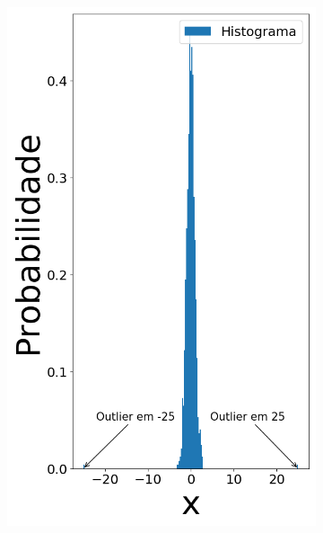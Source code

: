 \begin{figure}[H]
\begin{subfigure}[b]{0.27\textwidth}
		\caption{}
		\label{fig:randn}
	\end{subfigure}
	\hfill
	\begin{subfigure}[b]{0.27\textwidth}
		\centering 
		\includegraphics[width=\linewidth]{./figuras/datanormal_25}
		\caption{}
		\label{fig:randn_out}
	\end{subfigure}
	\hfill
	\begin{subfigure}[b]{0.27\textwidth}
		\centering 

\end{subfigure}
\end{figure}
